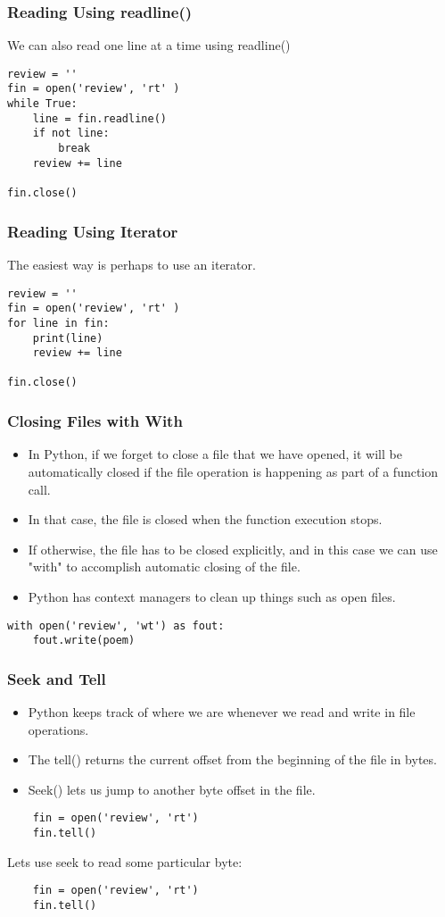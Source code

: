\documentclass{beamer}
\begin{document}
\begin{frame}[fragile]
\frametitle{Reading Using readline()}
We can also read one line at a time using readline()
\begin{lstlisting}
review = ''
fin = open('review', 'rt' )
while True:
    line = fin.readline()
    if not line:
        break
    review += line

fin.close()
\end{lstlisting}
\end{frame}

\begin{frame}[fragile]
\frametitle{Reading Using Iterator}
The easiest way is perhaps to use an iterator.
\begin{lstlisting}
review = ''
fin = open('review', 'rt' )
for line in fin:
    print(line)
    review += line

fin.close()
\end{lstlisting}
\end{frame}

\begin{frame}[fragile]
\frametitle{Closing Files with With}

\begin{itemize}
\item In Python, if we forget to close a file that we have opened, it will be automatically closed if the file operation is happening as part of a function call.
\item In that case, the file is closed when the function execution stops.
\item If otherwise, the file has to be closed explicitly, and in this case we can use "with" to accomplish automatic closing of the file.
\item Python has context managers to clean up things such as open files.
\end{itemize}
\begin{lstlisting}
with open('review', 'wt') as fout:
    fout.write(poem)
\end{lstlisting}
\end{frame}


\begin{frame}[fragile]
\frametitle{Seek and Tell}
\begin{itemize}
\item Python keeps track of where we are whenever we read and write in file operations.
\item The tell() returns the current offset from the beginning of the file  in bytes.
\item Seek() lets us jump to another byte offset in the file.
\end{itemize}
\begin{lstlisting}
	fin = open('review', 'rt')
	fin.tell()
\end{lstlisting}
Lets use seek to read some particular byte:
\begin{lstlisting}
	fin = open('review', 'rt')
	fin.tell()
\end{lstlisting}
\end{frame}
\end{document}
